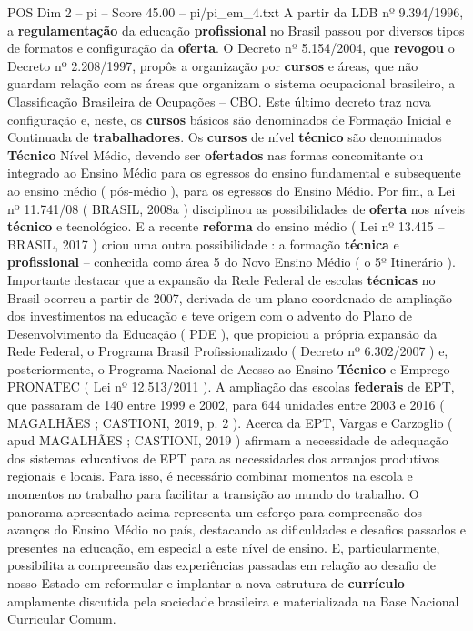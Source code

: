 \begin{textsample}{POS Dim 2 – pi – Score 45.00 – pi/pi\_em\_4.txt}
A partir da LDB nº 9.394/1996, a \textbf{regulamentação} da educação \textbf{profissional} no Brasil passou por diversos tipos de formatos e configuração da \textbf{oferta}.
O Decreto nº 5.154/2004, que \textbf{revogou} o Decreto nº 2.208/1997, propôs a organização por \textbf{cursos} e áreas, que não guardam relação com as áreas que organizam o sistema ocupacional brasileiro, a Classificação Brasileira de Ocupações – CBO.
Este último decreto traz nova configuração e, neste, os \textbf{cursos} básicos são denominados de Formação Inicial e Continuada de \textbf{trabalhadores}.
Os \textbf{cursos} de nível \textbf{técnico} são denominados \textbf{Técnico} Nível Médio, devendo ser \textbf{ofertados} nas formas concomitante ou integrado ao Ensino Médio para os egressos do ensino fundamental e subsequente ao ensino médio ( pós-médio ), para os egressos do Ensino Médio.
Por fim, a Lei nº 11.741/08 ( BRASIL, 2008a ) disciplinou as possibilidades de \textbf{oferta} nos níveis \textbf{técnico} e tecnológico.
E a recente \textbf{reforma} do ensino médio ( Lei nº 13.415 – BRASIL, 2017 ) criou uma outra possibilidade : a formação \textbf{técnica} e \textbf{profissional} – conhecida como área 5 do Novo Ensino Médio ( o 5º Itinerário ).
Importante destacar que a expansão da Rede Federal de escolas \textbf{técnicas} no Brasil ocorreu a partir de 2007, derivada de um plano coordenado de ampliação dos investimentos na educação e teve origem com o advento do Plano de Desenvolvimento da Educação ( PDE ), que propiciou a própria expansão da Rede Federal, o Programa Brasil Profissionalizado ( Decreto nº 6.302/2007 ) e, posteriormente, o Programa Nacional de Acesso ao Ensino \textbf{Técnico} e Emprego – PRONATEC ( Lei nº 12.513/2011 ).
A ampliação das escolas \textbf{federais} de EPT, que passaram de 140 entre 1999 e 2002, para 644 unidades entre 2003 e 2016 ( MAGALHÃES ; CASTIONI, 2019, p. 2 ).
Acerca da EPT, Vargas e Carzoglio ( apud MAGALHÃES ; CASTIONI, 2019 ) afirmam a necessidade de adequação dos sistemas educativos de EPT para as necessidades dos arranjos produtivos regionais e locais.
Para isso, é necessário combinar momentos na escola e momentos no trabalho para facilitar a transição ao mundo do trabalho.
O panorama apresentado acima representa um esforço para compreensão dos avanços do Ensino Médio no país, destacando as dificuldades e desafios passados e presentes na educação, em especial a este nível de ensino.
E, particularmente, possibilita a compreensão das experiências passadas em relação ao desafio de nosso Estado em reformular e implantar a nova estrutura de \textbf{currículo} amplamente discutida pela sociedade brasileira e materializada na Base Nacional Curricular Comum.

\end{textsample}
